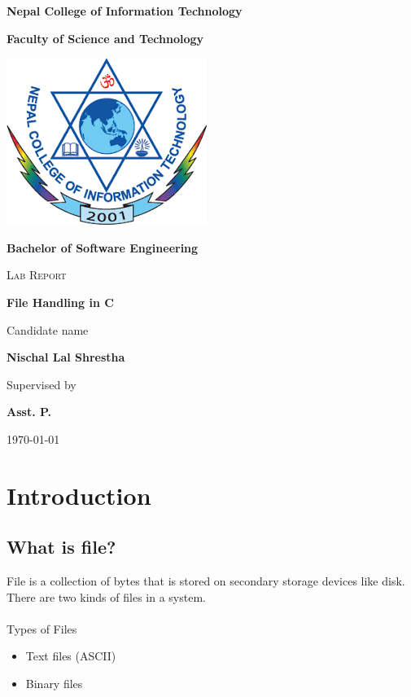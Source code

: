 \documentclass[12pt, a4paper, titlepage]{article}
\begin{document}
\begin{titlepage}
	\begin{center}
	{\Large \textbf{Nepal College of Information Technology} \par} 
	{\Large \textbf{ Faculty of Science and Technology} \par} 
	\vspace{0.75cm}
	\begin{center}
		\includegraphics[scale=0.4]{ncit.png}
	\end{center}
	\vspace{0.75cm}
	{\Large \textbf{Bachelor of Software Engineering} \par}
	\vspace{1.5cm}
	{\scshape\Large Lab Report \par}
	{\huge\bfseries File Handling in C \par}
	\vspace{2cm}

	Candidate name\par
	{\Large \textbf{Nischal Lal Shrestha} \par}
	\vfill
	Supervised by\par
	{\Large \textbf{Asst. P. } \par}
	\vfill
	{\large \today\par}
	\end{center}
\end{titlepage}

\section{Introduction}

\subsection{What is file?}
File is a collection of bytes that is stored on secondary storage devices like disk. There are two kinds of files in a system.\\
\\
Types of Files
\begin{itemize}
	\item Text files (ASCII)
    \item Binary files
\end{itemize}
\end{document}
